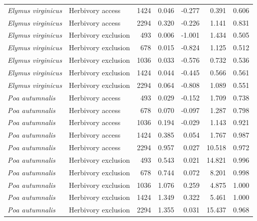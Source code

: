 \documentclass[12pt]{article}\usepackage[]{graphicx}\usepackage[dvipsnames]{xcolor}
\begin{document}
{\begin{landscape}
\begin{table}[ht]
\begin{tabular}{llrrrrr}
\textit{Elymus virginicus} & Herbivory access    & 1424 & 0.046  & -0.277 & 0.391  & 0.606 \\
\textit{Elymus virginicus} & Herbivory access    & 2294 & 0.320  & -0.226 & 1.141  & 0.831 \\
\textit{Elymus virginicus} & Herbivory exclusion & 493  & 0.006  & -1.001 & 1.434  & 0.505 \\
\textit{Elymus virginicus} & Herbivory exclusion & 678  & 0.015  & -0.824 & 1.125  & 0.512 \\
\textit{Elymus virginicus} & Herbivory exclusion & 1036 & 0.033  & -0.576 & 0.732  & 0.536 \\
\textit{Elymus virginicus} & Herbivory exclusion & 1424 & 0.044  & -0.445 & 0.566  & 0.561 \\
\textit{Elymus virginicus} & Herbivory exclusion & 2294 & 0.064  & -0.808 & 1.089  & 0.551 \\
\textit{Poa autumnalis}    & Herbivory access    & 493  & 0.029  & -0.152 & 1.709  & 0.738 \\
\textit{Poa autumnalis}    & Herbivory access    & 678  & 0.070  & -0.097 & 1.287  & 0.798 \\
\textit{Poa autumnalis}    & Herbivory access    & 1036 & 0.194  & -0.029 & 1.143  & 0.921 \\
\textit{Poa autumnalis}    & Herbivory access    & 1424 & 0.385  & 0.054  & 1.767  & 0.987 \\
\textit{Poa autumnalis}    & Herbivory access    & 2294 & 0.957  & 0.027  & 10.518 & 0.972 \\
\textit{Poa autumnalis}    & Herbivory exclusion & 493  & 0.543  & 0.021  & 14.821 & 0.996 \\
\textit{Poa autumnalis}    & Herbivory exclusion & 678  & 0.744  & 0.072  & 8.201  & 0.998 \\
\textit{Poa autumnalis}    & Herbivory exclusion & 1036 & 1.076  & 0.259  & 4.875  & 1.000 \\
\textit{Poa autumnalis}    & Herbivory exclusion & 1424 & 1.349  & 0.322  & 5.461  & 1.000 \\
\textit{Poa autumnalis}    & Herbivory exclusion & 2294 & 1.355  & 0.031  & 15.437 & 0.968 \\
\hline
\end{tabular}
\end{table}
\end{landscape}

}
\end{document}
